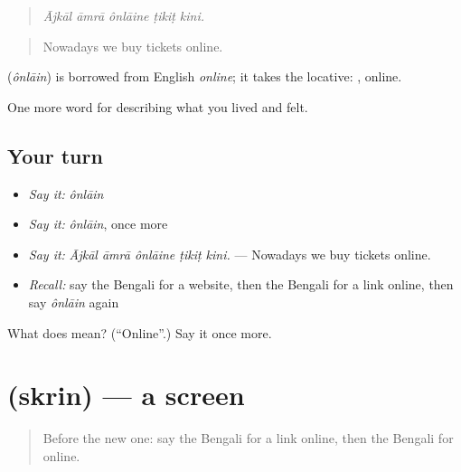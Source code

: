 \begin{quote}
    
\end{quote}

\begin{quote}
\emph{Ājkāl āmrā ônlāine ṭikiṭ kini.}
\end{quote}

\begin{quote}
Nowadays we buy tickets online.
\end{quote}

\begin{cousinweb}
\textbf{} (\emph{ônlāin}) is borrowed from English \emph{online}; it takes the locative: , online.
\end{cousinweb}

\begin{grammarlens}[title={What you've built}]
One more word for describing what you lived and felt.
\end{grammarlens}

\subsection*{Your turn}
\begin{itemize}
\raggedright
  \item \emph{Say it:} \emph{ônlāin}
  \item \emph{Say it:} \emph{ônlāin}, once more
  \item \emph{Say it:} \emph{Ājkāl āmrā ônlāine ṭikiṭ kini.} — Nowadays we buy tickets online.
  \item \emph{Recall:} say the Bengali for a website, then the Bengali for a link online, then say \emph{ônlāin} again
\end{itemize}

\begin{tcolorbox}[breakable,colback=teal!4,colframe=teal!35!black,title={Before you move on}]
What does  mean? (\textquotedblleft{}Online\textquotedblright{}.) Say it once more.
\end{tcolorbox}
\section[\texorpdfstring{\bn{স্ক্রিন} (skrin)}{স্ক্রিন (skrin)}]{ (skrin) — a screen}

\label{lesson:BN-C503-skrin}



\begin{quote}
Before the new one: say the Bengali for a link online, then the Bengali for online.
\end{quote}

